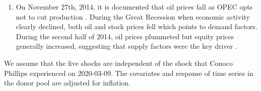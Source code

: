 \documentclass[11pt]{article}
\theoremstyle{definition}
\begin{document}
\begin{enumerate}
\begin{enumerate}
  \item On November 27th, 2014, it is documented that oil prices fall as OPEC opts not to cut production \citep{huppmann2015opec}. During the Great Recession when economic activity clearly declined, both oil and stock prices fell which points to demand factors. During the second half of 2014, oil prices plummeted but equity prices generally increased, suggesting that supply factors were the key driver \citep[Page 19]{baffes2015great}. 
  \end{enumerate}
We assume that the five shocks are independent of the shock that Conoco Phillips  experienced on 2020-03-09. The covariates and response of time series in the donor pool are adjusted for inflation.
\end{enumerate}





\end{document}
